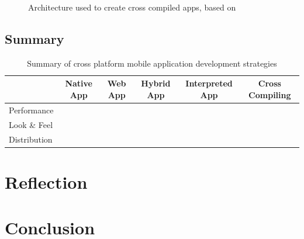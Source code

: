 \begin{figure}
    \begin{center}
        \caption{
            Architecture used to create cross compiled apps, based on \citep{Friese}
        }
        \label{fig:crosscompiled}
    \end{center}
\end{figure}

\subsection{Summary}

\begin{table}
    \begin{center}
        \begin{tabular}{l|c|c|c|c|c}
                         & Native App & Web App & Hybrid App & Interpreted App & Cross Compiling\\\hline
            Performance  &            &         &            &                 &                \\
            Look \& Feel &            &         &            &                 &                \\
            Distribution &            &         &            &                 &                \\
        \end{tabular}
		\caption{
			Summary of cross platform mobile application development strategies
		}
		\label{tab:architectures}
    \end{center}
\end{table}

\npar

\section{Reflection}

\section{Conclusion}